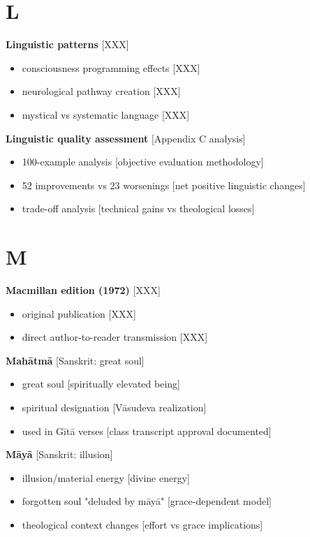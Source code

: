 \documentclass[11pt,twoside]{book}
\begin{document}
\section*{L}
\label{sec:orge8431be}

\textbf{\textbf{Linguistic patterns}} {[}XXX]
\begin{itemize}
\item consciousness programming effects [XXX]
\item neurological pathway creation [XXX]
\item mystical vs systematic language [XXX]
\end{itemize}

\textbf{\textbf{Linguistic quality assessment}} {[}Appendix C analysis]
\begin{itemize}
\item 100-example analysis [objective evaluation methodology]
\item 52 improvements vs 23 worsenings [net positive linguistic changes]
\item trade-off analysis [technical gains vs theological losses]
\end{itemize}
\section*{M}
\label{sec:org5e4082b}

\textbf{\textbf{Macmillan edition (1972)}} {[}XXX]
\begin{itemize}
\item original publication [XXX]
\item direct author-to-reader transmission [XXX]
\end{itemize}

\textbf{\textbf{Mahātmā}} {[}Sanskrit: great soul]
\begin{itemize}
\item great soul [spiritually elevated being]
\item spiritual designation [Vāsudeva realization]
\item used in Gītā verses [class transcript approval documented]
\end{itemize}

\textbf{\textbf{Māyā}} {[}Sanskrit: illusion]
\begin{itemize}
\item illusion/material energy [divine energy]
\item forgotten soul "deluded by māyā" [grace-dependent model]
\item theological context changes [effort vs grace implications]
\end{itemize}
\end{document}
